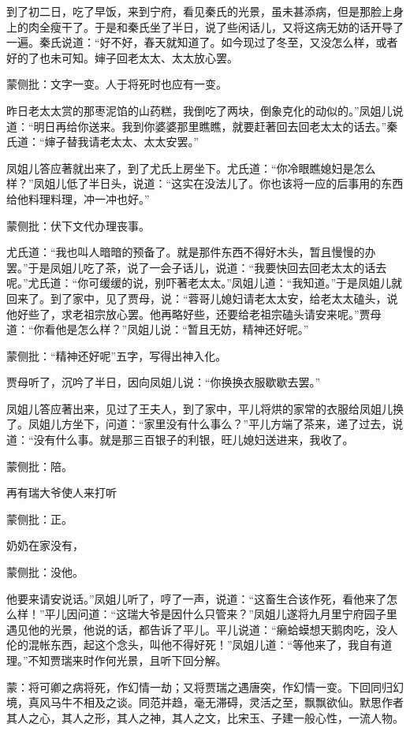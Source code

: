 \begin{parag}
    到了初二日，吃了早饭，来到宁府，看见秦氏的光景，虽未甚添病，但是那脸上身上的肉全瘦干了。于是和秦氏坐了半日，说了些闲话儿，又将这病无妨的话开导了一遍。秦氏说道：“好不好，春天就知道了。如今现过了冬至，又没怎么样，或者好的了也未可知。婶子回老太太、太太放心罢。\begin{note}蒙侧批：文字一变。人于将死时也应有一变。\end{note}昨日老太太赏的那枣泥馅的山药糕，我倒吃了两块，倒象克化的动似的。”凤姐儿说道：“明日再给你送来。我到你婆婆那里瞧瞧，就要赶著回去回老太太的话去。”秦氏道：“婶子替我请老太太、太太安罢。”
\end{parag}


\begin{parag}
    凤姐儿答应著就出来了，到了尤氏上房坐下。尤氏道：“你冷眼瞧媳妇是怎么样？”凤姐儿低了半日头，说道：“这实在没法儿了。你也该将一应的后事用的东西给他料理料理，冲一冲也好。”\begin{note}蒙侧批：伏下文代办理丧事。\end{note}尤氏道：“我也叫人暗暗的预备了。就是那件东西不得好木头，暂且慢慢的办罢。”于是凤姐儿吃了茶，说了一会子话儿，说道：“我要快回去回老太太的话去呢。”尤氏道：“你可缓缓的说，别吓著老太太。”凤姐儿道：“我知道。”于是凤姐儿就回来了。到了家中，见了贾母，说：“蓉哥儿媳妇请老太太安，给老太太磕头，说他好些了，求老祖宗放心罢。他再略好些，还要给老祖宗磕头请安来呢。”贾母道：“你看他是怎么样？”凤姐儿说：“暂且无妨，精神还好呢。”\begin{note}蒙侧批：“精神还好呢”五字，写得出神入化。\end{note}贾母听了，沉吟了半日，因向凤姐儿说：“你换换衣服歇歇去罢。”
\end{parag}


\begin{parag}
    凤姐儿答应著出来，见过了王夫人，到了家中，平儿将烘的家常的衣服给凤姐儿换了。凤姐儿方坐下，问道：“家里没有什么事么？”平儿方端了茶来，递了过去，说道：“没有什么事。就是那三百银子的利银，旺儿媳妇送进来，我收了。\begin{note}蒙侧批：陪。\end{note}再有瑞大爷使人来打听\begin{note}蒙侧批：正。\end{note}奶奶在家没有，\begin{note}蒙侧批：没他。\end{note}他要来请安说话。”凤姐儿听了，哼了一声，说道：“这畜生合该作死，看他来了怎么样！”平儿因问道：“这瑞大爷是因什么只管来？”凤姐儿遂将九月里宁府园子里遇见他的光景，他说的话，都告诉了平儿。平儿说道：“癞蛤蟆想天鹅肉吃，没人伦的混帐东西，起这个念头，叫他不得好死！”凤姐儿道：“等他来了，我自有道理。”不知贾瑞来时作何光景，且听下回分解。
\end{parag}


\begin{parag}
    \begin{note}蒙：将可卿之病将死，作幻情一劫；又将贾瑞之遇唐突，作幻情一变。下回同归幻境，真风马牛不相及之谈。同范并趋，毫无滞碍，灵活之至，飘飘欲仙。默思作者其人之心，其人之形，其人之神，其人之文，比宋玉、子建一般心性，一流人物。\end{note}
\end{parag}
